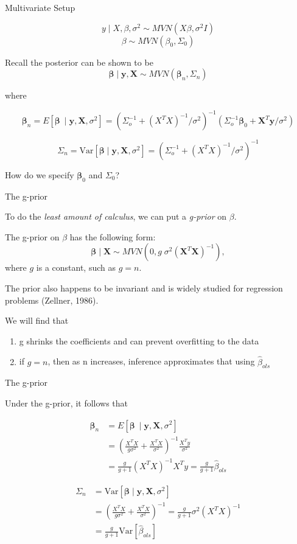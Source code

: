 \documentclass[ignorenonframetext,]{beamer}
\providecommand{\tightlist}{%
  \setlength{\itemsep}{0pt}\setlength{\parskip}{0pt}}
\newcommand{\bbeta}{\bm{\beta}}
\newcommand{\bX}   {\bm{X}}
\newcommand{\Var}{\text{Var}}
\begin{document}
\begin{frame}{Multivariate Setup}

\[y \mid X,\beta, \sigma^2 \sim MVN( X\beta, \sigma^2 I)\]
\[\beta \sim MVN(\beta_0, \Sigma_0) \]

Recall the posterior can be shown to be
\[\bbeta \mid \bm{y}, \bX \sim MVN(\bbeta_n, \Sigma_n)\]

where

\[\bbeta_n = E[\bbeta\ \mid \bm{y}, \bX, \sigma^2] = (\Sigma_o^{-1} + (X^TX)^{-1}/\sigma^2)^{-1}
(\Sigma_o^{-1}\bbeta_0 + \bX^T\bm{y}/\sigma^2)\]

\[\Sigma_n = \text{Var}[\bbeta \mid \bm{y}, \bX, \sigma^2] = (\Sigma_o^{-1} + (X^TX)^{-1}/\sigma^2)^{-1}\]

How do we specify \(\bbeta_0\) and \(\Sigma_0\)?

\end{frame}

\begin{frame}{The g-prior}

To do the \emph{least amount of calculus}, we can put a \emph{g-prior}
on \(\beta.\)

The g-prior on \(\beta\) has the following form:
\[ \bbeta \mid \bX  \sim MVN(0, g\; \sigma^2 (\bX^T\bX)^{-1}),\] where
\(g\) is a constant, such as \(g=n.\)

The prior also happens to be invariant and is widely studied for
regression problems (Zellner, 1986).

We will find that

\begin{enumerate}
\def\labelenumi{\arabic{enumi}.}
\tightlist
\item
  g shrinks the coefficients and can prevent overfitting to the data
\item
  if \(g = n\), then as n increases, inference approximates that using
  \(\hat{\beta}_{ols}\)
\end{enumerate}

\end{frame}

\begin{frame}{The g-prior}

Under the g-prior, it follows that

\begin{align}
\bbeta_n &= E[\bbeta\ \mid \bm{y}, \bX, \sigma^2]  \\
&= \left(\frac{X^TX}{g \sigma^2} + \frac{X^TX}{\sigma^2}\right)^{-1} \frac{X^Ty}{\sigma^2} \\
&= \frac{g}{g+1} (X^TX)^{-1} X^Ty
= \frac{g}{g+1} \hat{\beta}_{ols}
\end{align}

\begin{align}
\Sigma_n &= \text{Var}[\bbeta \mid \bm{y}, \bX, \sigma^2] \\
&= \left(\frac{X^TX}{g \sigma^2} + \frac{X^TX}{\sigma^2}\right)^{-1}
=\frac{g}{g+1} \sigma^2 (X^TX)^{-1} \\
&= \frac{g}{g+1} \Var[\hat{\beta}_{ols}]
\end{align}

\end{frame}
\end{document}
